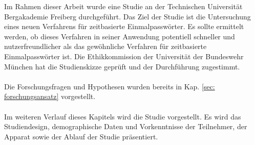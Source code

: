 Im Rahmen dieser Arbeit wurde eine Studie an der Technischen Universität 
Bergakademie Freiberg durchgeführt. Das Ziel der 
Studie ist die Untersuchung eines neuen Verfahrens für zeitbasierte 
Einmalpasswörter. Es sollte ermittelt werden, ob dieses Verfahren in seiner 
Anwendung potentiell schneller und nutzerfreundlicher als das gewöhnliche 
Verfahren für zeitbasierte Einmalpasswörter ist. Die Ethikkommission der Universität 
der Bundeswehr München hat die Studienskizze geprüft und der Durchführung zugestimmt.
\\\\
Die Forschungsfragen und Hypothesen wurden bereits in Kap. \ref{sec: forschungsansatz} vorgestellt.
\\\\
Im weiteren Verlauf dieses Kapitels wird die Studie vorgestellt. Es wird das 
Studiendesign, demographische Daten und Vorkenntnisse der Teilnehmer, der 
Apparat sowie der Ablauf der Studie präsentiert.